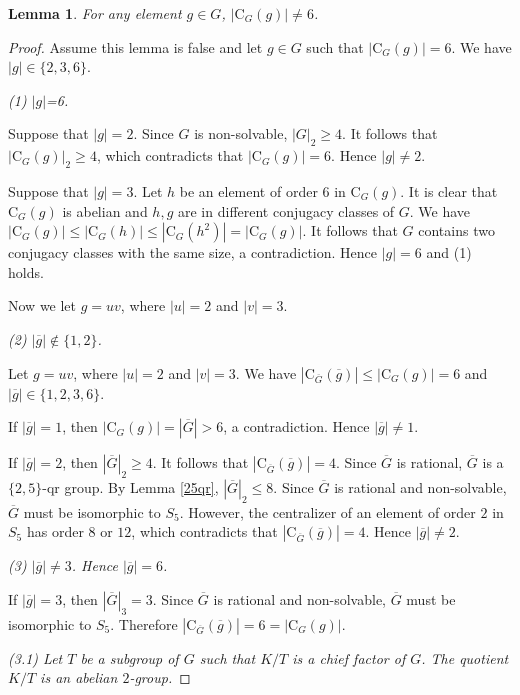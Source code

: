 \documentclass[11pt]{article}
\providecommand{\C}{{\mathrm{C}}}
\newtheorem{lem}{Lemma}
\begin{document}
\begin{lem}
    For any element $g \in G$, $|\C_G(g)| \neq 6$.
\end{lem}

\begin{proof}
    Assume this lemma is false and let $g\in G$ such that $|\C_G(g)|=6$.
    We have $|g|\in \{2,3,6\}$.

\medskip
{\sl (1) $|g|$=6.}
    
    Suppose that $|g|=2$.
    Since $G$ is non-solvable, $|G|_2\geq 4$.
    It follows that $|\C_G(g)|_2\geq 4$, which contradicts that $|\C_G(g)|=6$.
    Hence $|g|\neq 2$.
    
    Suppose that $|g|=3$.
    Let $h$ be an element of order $6$ in $\C_G(g)$.
    It is clear that $\C_G(g)$ is abelian and $h, g$ are in different conjugacy classes of $G$.
    We have $|\C_G(g)|\leq |\C_G(h)|\leq |\C_G(h^2)|=|\C_G(g)|$.
    It follows that $G$ contains two conjugacy classes with the same size, 
    a contradiction. 
    Hence $|g|=6$ and (1) holds.

    Now we let $g=uv$, where $|u|=2$ and $|v|=3$.

\medskip
{\sl (2) $|\overline{g}|\notin \{1, 2\}$.}
    
    Let $g=uv$, where $|u|=2$ and $|v|=3$.
    We have $|\C_{\overline{G}}(\overline{g})|\leq |\C_G(g)|=6$ and $|\overline{g}|\in \{1, 2, 3, 6\}$.

    If $|\overline{g}|=1$, then $|\C_G(g)|=|\overline{G}| > 6$, a contradiction. 
    Hence $|\overline{g}|\neq 1$.

    If $|\overline{g}|=2$, then $|\overline{G}|_2 \geq 4$. 
    It follows that $|\C_{\overline{G}}(\overline{g})|=4$.
    Since $\overline{G}$ is rational, $\overline{G}$ is a $\{2, 5\}$-qr group.
    By Lemma \ref{25qr}, $|\overline{G}|_2\leq 8$.
    Since $\overline{G}$ is rational and non-solvable, $\overline{G}$ must be isomorphic to $S_5$.
    However, the centralizer of an element of order $2$ in $S_5$ has order $8$ or $12$, which contradicts that $|\C_{\overline{G}}(\overline{g})|=4$.
    Hence $|\overline{g}|\neq 2$.

\medskip
{\sl (3) $|\overline{g}|\neq 3$. Hence $|\overline{g}|=6$.}

    If $|\overline{g}|=3$, then $|\overline{G}|_3 = 3$.
    Since $\overline{G}$ is rational and non-solvable, 
    $\overline{G}$ must be isomorphic to $S_5$.
    Therefore $|\C_{\overline{G}}(\overline{g})| = 6 = |\C_G(g)|$.

{\sl (3.1) Let $T$ be a subgroup of $G$ such that $K/T$ is a chief factor of $G$.
    The quotient $K/T$ is an abelian $2$-group.}
    

\end{proof}
\end{document}

